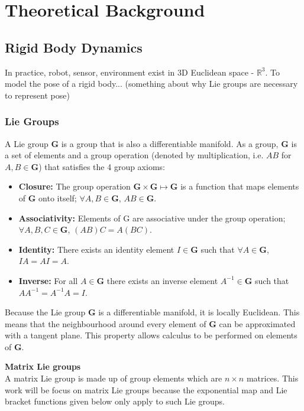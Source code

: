 \section{Theoretical Background}

\subsection{Rigid Body Dynamics}
	In practice, robot, sensor, environment exist in 3D Euclidean space - $\mathbb{R}^3$.
	To model the pose of a rigid body... (something about why Lie groups are necessary to represent pose)
			
	\subsubsection{Lie Groups}		
		A Lie group $\mathbf{G}$ is a group that is also a differentiable manifold.
		As a group, $\mathbf{G}$ is a set of elements and a group operation (denoted by multiplication, i.e. $AB$ for $A,B \in \mathbf{G}$) that satisfies the 4 group axioms:
		
		\begin{itemize}
		\item \textbf{Closure:} 
			The group operation
			$\mathbf{G} \times \mathbf{G} \mapsto \mathbf{G}$ 
			is a function that maps elements of $\mathbf{G}$ onto itself;
			$\forall A,B \in \mathbf{G}$, $AB \in \mathbf{G}$.
		\item \textbf{Associativity:} Elements of G are associative under the group operation;
			$\forall A,B,C \in \mathbf{G}$, $(AB)C=A(BC)$.
		\item \textbf{Identity:} There exists an identity element $I \in \mathbf{G}$  such that
			$\forall A \in \mathbf{G}$, $IA = AI = A$.
		\item \textbf{Inverse:} For all $A \in \mathbf{G}$ there exists an inverse element $A^{-1} \in \mathbf{G}$ such that $AA^{-1}=A^{-1}A=I$. 
		\end{itemize}
		
		Because the Lie group $\mathbf{G}$ is a differentiable manifold, it is locally Euclidean. This means that the neighbourhood around every element of $\mathbf{G}$ can be approximated with a tangent plane. This property allows calculus to be performed on elements of $\mathbf{G}$.
		
		\textbf{Matrix Lie groups}\\
			A matrix Lie group is made up of group elements which are $n \times n$ matrices.
			This work will be focus on matrix Lie groups because the exponential map and Lie bracket functions given below only apply to such Lie groups.
		
